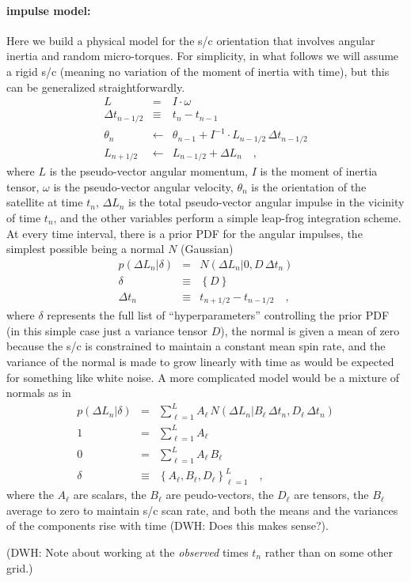 \documentclass[12pt]{article}
\begin{document}
\paragraph{impulse model:}
Here we build a physical model for the s/c orientation that involves
angular inertia and random micro-torques.  For simplicity, in what
follows we will assume a rigid s/c (meaning no variation of the moment
of inertia with time), but this can be generalized straightforwardly.
\begin{eqnarray}\displaystyle
L &=& I \cdot \omega
\\
\Delta t_{n-1/2} &\equiv& t_n - t_{n-1}
\\
\theta_n &\leftarrow& \theta_{n-1} + I^{-1}\cdot L_{n-1/2}\,\Delta t_{n-1/2}
\\
L_{n+1/2} &\leftarrow& L_{n-1/2} + \Delta L_n
\quad ,
\end{eqnarray}
where $L$ is the pseudo-vector angular momentum, $I$ is the moment of
inertia tensor, $\omega$ is the pseudo-vector angular velocity,
$\theta_n$ is the orientation of the satellite at time $t_n$, $\Delta
L_n$ is the total pseudo-vector angular impulse in the vicinity of
time $t_n$, and the other variables perform a simple leap-frog
integration scheme.  At every time interval, there is a prior PDF for
the angular impulses, the simplest possible being a normal $N$
(Gaussian)
\begin{eqnarray}\displaystyle
p(\Delta L_n|\delta) &=& N(\Delta L_n|0,D\,\Delta t_n)
\\
\delta &\equiv& \left\{D\right\}
\\
\Delta t_n &\equiv& t_{n+1/2} - t_{n-1/2}
\quad ,
\end{eqnarray}
where $\delta$ represents the full list of ``hyperparameters''
controlling the prior PDF (in this simple case just a variance tensor
$D$), the normal is given a mean of zero because the s/c is
constrained to maintain a constant mean spin rate, and the variance of
the normal is made to grow linearly with time as would be expected for
something like white noise.  A more complicated model would be a
mixture of normals as in
\begin{eqnarray}\displaystyle
p(\Delta L_n|\delta) &=& \sum_{\ell=1}^L A_\ell\,N(\Delta L_n|B_\ell\,\Delta t_n, D_\ell\,\Delta t_n)
\\
1 &=& \sum_{\ell=1}^L A_\ell
\\
0 &=& \sum_{\ell=1}^L A_\ell\,B_\ell
\\
\delta &\equiv& \left\{A_\ell, B_\ell, D_\ell\right\}_{\ell=1}^L
\quad ,
\end{eqnarray}
where the $A_\ell$ are scalars, the $B_\ell$ are peudo-vectors, the
$D_\ell$ are tensors, the $B_\ell$ average to zero to maintain s/c
scan rate, and both the means and the variances of the components rise
with time (DWH: Does this makes sense?).

(DWH: Note about working at the \emph{observed} times $t_n$ rather
than on some other grid.)
\end{document}
